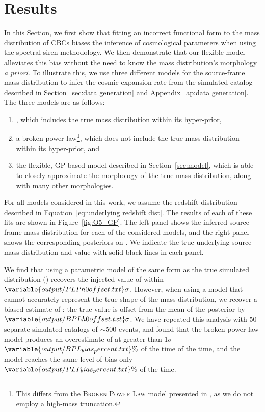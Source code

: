 \documentclass[preprint2,linenumbers]{aastex631}
\begin{document}
\section{Results}
\label{sec:results}
In this Section, we first show that fitting an incorrect functional form to the mass distribution of \acp{CBC} biases the inference of cosmological parameters when using the spectral siren methodology.
We then demonstrate that our flexible model alleviates this bias without the need to know the mass distribution's morphology \emph{a priori}.
To illustrate this, we use three different models for the source-frame mass distribution to infer the cosmic expansion rate from the simulated catalog described in Section~\ref{sec:data generation} and Appendix~\ref{ap:data generation}.
The three models are as follows:
\begin{enumerate}
    \item \plp{}, which includes the true mass distribution within its hyper-prior,
    \item a broken power law\footnote{This differs from the \textsc{Broken Power Law} model presented in \citet{abbott_population_2021}, as we do not employ a high-mass truncation.}, which does not include the true mass distribution within its hyper-prior, and 
    \item the flexible, \ac{GP}-based model described in Section~\ref{sec:model}, which is able to closely approximate the morphology of the true mass distribution, along with many other morphologies.
\end{enumerate}
For all models considered in this work, we assume the redshift distribution described in Equation~\ref{eq:underlying redshift dist}.
The results of each of these fits are shown in Figure~\ref{fig:O5_GP}. 
The left panel shows the inferred source frame mass distribution for each of the considered models, and the right panel shows the corresponding posteriors on \Ho{}. 
We indicate the true underlying source mass distribution and \Ho{} value with solid black lines in each panel. 

We find that using a parametric model of the same form as the true simulated distribution (\plp) recovers the injected value of \Ho{} within $\variable{output/PLPh0offset.txt}\sigma$.
However, when using a model that cannot accurately represent the true shape of the mass distribution, we recover a biased estimate of \Ho: the true value is offset from the mean of the posterior by $\variable{output/BPLh0offset.txt}\sigma$.
We have repeated this analysis with 50 separate simulated catalogs of $\sim500$ events, and found that the broken power law model produces an overestimate of \Ho{} at greater than $1\sigma$ $\variable{output/BPL_bias_percent.txt}\%$ of the time of the time, %
and the \plp{} model reaches the same level of bias only $\variable{output/PLP_bias_percent.txt}\%$ 
of the time.
\end{document}
